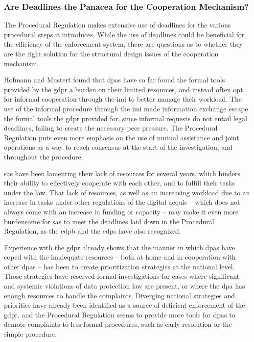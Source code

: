 \subsubsection{Are Deadlines the Panacea for the Cooperation Mechanism?}
\label{sec:ch4-deadlines}

The Procedural Regulation makes extensive use of deadlines for the various procedural steps it introduces. While the use of deadlines could be beneficial for the efficiency of the enforcement system, there are questions as to whether they are the right solution for the structural design issues of the cooperation mechanism.

Hofmann and Mustert found that \glspl{dpa} have so far found the formal tools provided by the \gls{gdpr} a burden on their limited resources, and instead often opt for informal cooperation through the \gls{imi} to better manage their workload.\autocite[466--467]{hofmannmustertScholtenHandbook2023}
The use of the informal procedure through the \gls{imi} made information exchange escape the formal tools the \gls{gdpr} provided for, since informal requests do not entail legal deadlines, failing to create the necessary peer pressure.\autocite[466--467]{hofmannmustertScholtenHandbook2023}
The Procedural Regulation puts even more emphasis on the use of mutual assistance and joint operations as a way to reach consensus at the start of the investigation, and throughout the procedure.

\glspl{sa} have been lamenting their lack of resources for several years, which hinders their ability to effectively cooperate with each other, and to fulfill their tasks under the law.\autocites[30]{APjaarverslag2025}[9]{APjaarverslag2024}[11--12]{APjaarverslag2020}
That lack of resources, as well as an increasing workload due to an increase in tasks under other regulations of the digital acquis\autocite{APtoezichtAI} -- which does not always come with an increase in funding or capacity\autocite{GroeiAPNoodzakelijk} -- may make it even more burdensome for \glspl{sa} to meet the deadlines laid down in the Procedural Regulation, as the \gls{edpb} and the \gls{edps} have also recognized.\autocite[45]{edpbJointOpinion012023} 

Experience with the \gls{gdpr} already shows that the manner in which \glspl{dpa} have coped with the inadequate resources -- both at home and in cooperation with other \glspl{dpa} -- has been to create prioritization strategies at the national level.\autocites{BeleidsregelsAP}{PrioritizationCNPD}
Those strategies have reserved formal investigations for cases where significant and systemic violations of data protection law are present, or where the \gls{dpa} has enough resources to handle the complaints.\autocite[501]{mustertProceduralisingEnforcement2026}
Diverging national strategies and priorities have already been identified as a source of deficient enforcement of the \gls{gdpr}, and the Procedural Regulation seems to provide more tools for \glspl{dpa} to demote complaints to less formal procedures, such as early resolution or the simple procedure.

